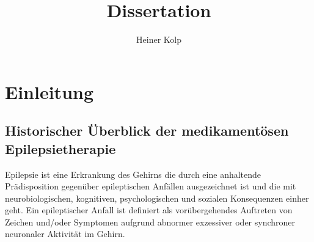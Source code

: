 \documentclass[a4paper,11pt]{report}
\title{Dissertation}
\author{Heiner Kolp}
\begin{document}
\setlength{\parindent}{0pt}
\maketitle
\tableofcontents

\chapter{Einleitung}

\section{Historischer Überblick der medikamentösen Epilepsietherapie}
Epilepsie ist eine Erkrankung des Gehirns die durch eine anhaltende Prädisposition gegenüber epileptischen Anfällen ausgezeichnet ist und die mit neurobiologischen, kognitiven, psychologischen und sozialen Konsequenzen einher geht. Ein epileptischer Anfall ist definiert als vorübergehendes Auftreten von Zeichen und/oder Symptomen aufgrund abnormer exzessiver oder synchroner neuronaler Aktivität im Gehirn\cite{Fisher.2005}.\\
\end{document}
